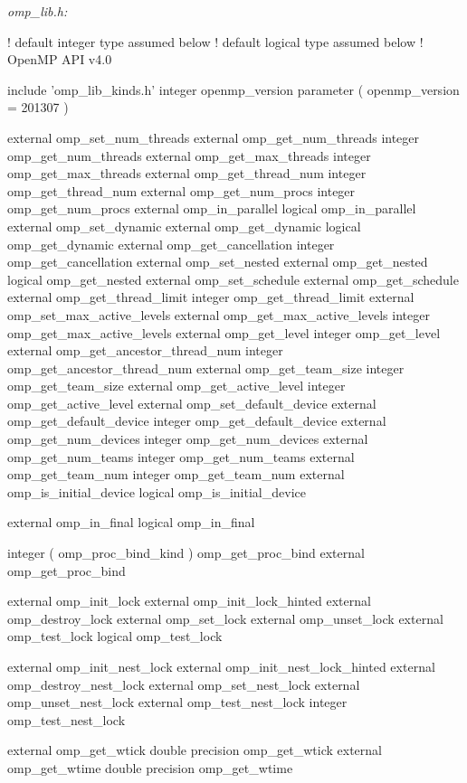 \emph{omp\_lib.h:}

{\small \begin{codepar}
! default integer type assumed below
! default logical type assumed below
! OpenMP API v4.0

     include 'omp\_lib\_kinds.h'
     integer openmp\_version
     parameter ( openmp\_version = 201307 )

     external omp\_set\_num\_threads
     external omp\_get\_num\_threads
     integer omp\_get\_num\_threads
     external omp\_get\_max\_threads
     integer omp\_get\_max\_threads
     external omp\_get\_thread\_num
     integer omp\_get\_thread\_num
     external omp\_get\_num\_procs
     integer omp\_get\_num\_procs
     external omp\_in\_parallel
     logical omp\_in\_parallel
     external omp\_set\_dynamic
     external omp\_get\_dynamic
     logical omp\_get\_dynamic
     external omp\_get\_cancellation
     integer omp\_get\_cancellation
     external omp\_set\_nested
     external omp\_get\_nested
     logical omp\_get\_nested
     external omp\_set\_schedule
     external omp\_get\_schedule
     external omp\_get\_thread\_limit
     integer omp\_get\_thread\_limit
     external omp\_set\_max\_active\_levels
     external omp\_get\_max\_active\_levels
     integer omp\_get\_max\_active\_levels
     external omp\_get\_level
     integer omp\_get\_level
     external omp\_get\_ancestor\_thread\_num
     integer omp\_get\_ancestor\_thread\_num
     external omp\_get\_team\_size
     integer omp\_get\_team\_size
     external omp\_get\_active\_level
     integer omp\_get\_active\_level
     external omp\_set\_default\_device
     external omp\_get\_default\_device
     integer omp\_get\_default\_device
     external omp\_get\_num\_devices
     integer omp\_get\_num\_devices
     external omp\_get\_num\_teams
     integer omp\_get\_num\_teams
     external omp\_get\_team\_num
     integer omp\_get\_team\_num
     external omp\_is\_initial\_device
     logical omp\_is\_initial\_device

     external omp\_in\_final
     logical omp\_in\_final

     integer ( omp\_proc\_bind\_kind ) omp\_get\_proc\_bind
     external omp\_get\_proc\_bind

     external omp\_init\_lock
     external omp\_init\_lock\_hinted
     external omp\_destroy\_lock
     external omp\_set\_lock
     external omp\_unset\_lock
     external omp\_test\_lock
     logical omp\_test\_lock

     external omp\_init\_nest\_lock
     external omp\_init\_nest\_lock\_hinted
     external omp\_destroy\_nest\_lock
     external omp\_set\_nest\_lock
     external omp\_unset\_nest\_lock
     external omp\_test\_nest\_lock
     integer omp\_test\_nest\_lock

     external omp\_get\_wtick
     double precision omp\_get\_wtick
     external omp\_get\_wtime
     double precision omp\_get\_wtime
\end{codepar}}





